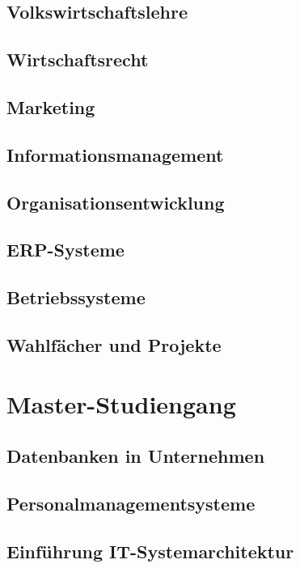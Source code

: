 \documentclass{hswbook}
\begin{document}
    \chapter{Volkswirtschaftslehre}
    \chapter{Wirtschaftsrecht}
    \chapter{Marketing}    
    \chapter{Informationsmanagement}
    \chapter{Organisationsentwicklung}    
    \chapter{ERP-Systeme}
    \chapter{Betriebssysteme}    
    \chapter{Wahlfächer und Projekte}

\part{Master-Studiengang}
    \chapter{Datenbanken in Unternehmen}
    \chapter{Personalmanagementsysteme}
    \chapter{Einführung IT-Systemarchitektur}
\end{document}
